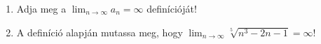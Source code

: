\documentclass[11pt]{scrartcl}
\begin{document}
\begin{enumerate}
	\item Adja meg a $\lim_{n \to \infty} a_n = \infty$ definícióját!

	\item A definíció alapján mutassa meg, hogy
	      $\lim_{n \to \infty} \sqrt[5]{n^3 - 2n - 1} = \infty$!
\end{enumerate}
\end{document}
